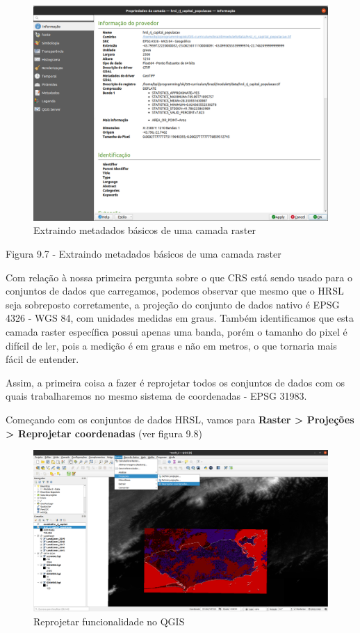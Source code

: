 \documentclass[
]{krantz}
\begin{document}
\begin{figure}
\centering
\includegraphics{media/modulo9/fig97.png}
\caption{Extraindo metadados básicos de uma camada raster}
\end{figure}

Figura 9.7 - Extraindo metadados básicos de uma camada raster

Com relação à nossa primeira pergunta sobre o que CRS está sendo usado para o conjuntos de dados que carregamos, podemos observar que mesmo que o HRSL seja sobreposto corretamente, a projeção do conjunto de dados nativo é EPSG 4326 - WGS 84, com unidades medidas em graus. Também identificamos que esta camada raster específica possui apenas uma banda, porém o tamanho do pixel é difícil de ler, pois a medição é em graus e não em metros, o que tornaria mais fácil de entender.

Assim, a primeira coisa a fazer é reprojetar todos os conjuntos de dados com os quais trabalharemos no mesmo sistema de coordenadas - EPSG 31983.

Começando com os conjuntos de dados HRSL, vamos para \textbf{Raster \textgreater{} Projeções \textgreater{} Reprojetar coordenadas} (ver figura 9.8)

\begin{figure}
\centering
\includegraphics{media/modulo9/fig98.png}
\caption{Reprojetar funcionalidade no QGIS}
\end{figure}
\end{document}
